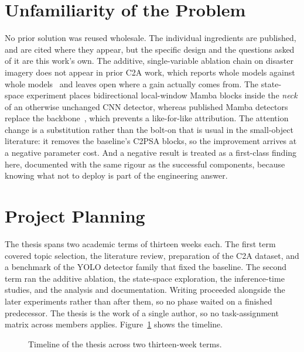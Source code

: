 \section{Unfamiliarity of the Problem}
No prior solution was reused wholesale. The individual ingredients are
published, and are cited where they appear, but the specific design and the
questions asked of it are this work's own. The additive, single-variable
ablation chain on disaster imagery does not appear in prior C2A work, which
reports whole models against whole models~\cite{nihal2024c2a} and leaves open
where a gain actually comes from. The state-space experiment places
bidirectional local-window Mamba blocks inside the \emph{neck} of an
otherwise unchanged CNN detector, whereas published Mamba detectors replace
the backbone~\cite{wang2025mambayolo}, which prevents a like-for-like
attribution. The attention change is a substitution rather than the bolt-on
that is usual in the small-object literature: it removes the baseline's
C2PSA blocks, so the improvement arrives at a negative parameter cost. And a
negative result is treated as a first-class finding here, documented with
the same rigour as the successful components, because knowing what not to
deploy is part of the engineering answer.

\section{Project Planning}
The thesis spans two academic terms of thirteen weeks each. The first term
covered topic selection, the literature review, preparation of the C2A
dataset, and a benchmark of the YOLO detector family that fixed the baseline.
The second term ran the additive ablation, the state-space exploration, the
inference-time studies, and the analysis and documentation. Writing proceeded
alongside the later experiments rather than after them, so no phase waited on
a finished predecessor. The thesis is the work of a single author, so no
task-assignment matrix across members applies. Figure~\ref{fig:gantt} shows
the timeline.

\begin{figure}[tbp]
  \centering
  \resizebox{\linewidth}{!}{}
  \caption{Timeline of the thesis across two thirteen-week terms.}
  \label{fig:gantt}
\end{figure}

